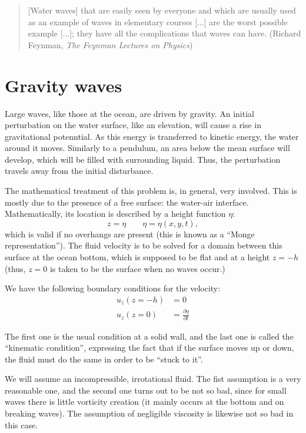 \begin{quote}
[Water waves] that are easily seen by everyone and which are usually
used as an example of waves in elementary courses [...] are the worst
possible example [...]; they have all the complications that waves can
have. \hfill (Richard Feynman, \textit{The Feynman Lectures on Physics})
\end{quote}

\section{Gravity waves}
\label{sec:gravity_waves}

Large waves, like those at the ocean, are driven by gravity. An
initial perturbation on the water surface, like an elevation, will
cause a rise in gravitational potenntial. As this energy is
transferred to kinetic energy, the water around it moves. Similarly to
a pendulum, an area below the mean surface will develop, which will be
filled with surrounding liquid. Thus, the perturbation travels away
from the initial disturbance.

The mathematical treatment of this problem is, in general, very
involved. This is mostly due to the presence of a free surface: the
water-air interface. Mathematically, its location is described by a
height function $\eta$:
\begin{equation}
  \label{eq:waves_elevation}
  z=\eta  \qquad  \eta=\eta(x,y,t) ,
\end{equation}
which is valid if no overhangs are present (this is known as a ``Monge
representation''). The fluid velocity is to be solved for a domain
between this surface at the ocean bottom, which is supposed to be flat
and at a height $z=-h$ (thus, $z=0$ is taken to be the surface when no
waves occur.)

We have the following boundary conditions for the velocity:
\begin{align}
  \label{eq:waves_bc}
  u_z(z=-h) &= 0 \\
  \label{eq:waves_bc2}
  u_z(z=0) &=  \frac{\partial \eta}{\partial t}
\end{align}


The first one is the usual condition at a solid wall, and the last one
is called the ``kinematic condition'', expressing the fact that if the
surface moves up or down, the fluid must do the same in order to be
``stuck to it''.

We will assume an incompressible, irrotational fluid. The fist
assumption is a very reasonable one, and the second one turns out to
be not so bad, since for small waves there is little vorticity
creation (it mainly occurs at the bottom and on breaking waves).  The
assumption of negligible viscosity is likewise not so bad in this
case.



